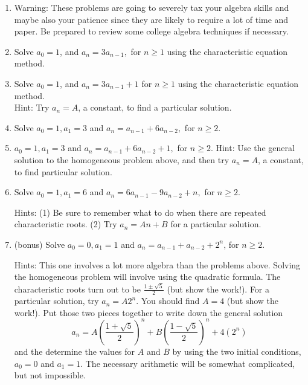 \documentclass[11pt]{amsart}
\begin{document}
\begin{enumerate}

\item[] 
\begin{center}
{\small Warning: These problems are going to severely tax your algebra skills and maybe also your patience since they are likely to require a lot of time and paper. Be prepared to review some college algebra techniques if necessary.}\\[5pt]
\end{center}

\item Solve $a_0=1$, and $a_n=3a_{n-1},$ for $n\geq 1$ using the characteristic equation method.\\[5pt]

\item Solve $a_0=1$, and $a_n=3a_{n-1} + 1$ for $n\geq 1$ using the characteristic equation method.\\ Hint: Try $a_{n}= A$, a constant,  to find a particular solution.\\[5pt]


\item    Solve $a_0=1, a_1=3$ and $a_n=a_{n-1}+6a_{n-2},$ for $n\geq 2$.\\[5pt]

\item $a_0=1, a_1=3$ and $a_n=a_{n-1}+6a_{n-2}+1,$ for $n\geq 2$.
Hint:  Use the general solution to the homogeneous problem above, and then
 try $a_n = A$, a constant, to find particular solution.\\[5pt]

\item Solve  $a_0=1, a_1=6$ and $a_n=6a_{n-1}-9a_{n-2}+n,$ for $n\geq 2$.

Hints: (1) Be sure to remember what to do when there are repeated characteristic roots.
(2) Try $a_n = An + B$ for a particular solution.\\[5pt]

\item  (bonus)
Solve $a_0=0, a_1=1$ and $a_n=a_{n-1}+a_{n-2}+2^n$, for $n\geq 2$.

Hints: This one involves a lot more algebra than the problems above. Solving 
the homogeneous problem will involve using the quadratic formula. 
The characteristic roots turn out to be $\displaystyle \frac{1\pm \sqrt{5}}{2}$ (but show the work!). For a particular solution, try 
$a_n = A2^n$. You should find $A=4$ (but show the work!).  Put those two pieces together to write down the general solution 
\[ 
a_n = A\left(\frac{1+\sqrt{5}}{2}\right)^n + B\left(\frac{1-\sqrt{5}}{2}\right)^n + 4(2^n)
\]
and the determine the values for $A$ and $B$ by using the two initial conditions, 
$a_0 = 0$ and $a_1 = 1$. The necessary arithmetic will be somewhat complicated, but not impossible. \\[5pt]

\end{enumerate}
\end{document}
